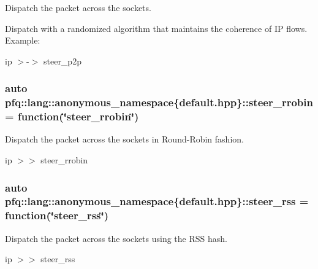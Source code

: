 Dispatch the packet across the sockets. 

Dispatch with a randomized algorithm that maintains the coherence of IP flows. Example\+:

ip $>$-\/$>$ steer\+\_\+p2p 
\subsubsection[{\texorpdfstring{steer\+\_\+rrobin}{steer_rrobin}}]{\setlength{\rightskip}{0pt plus 5cm}auto pfq\+::lang\+::anonymous\+\_\+namespace\{default.\+hpp\}\+::steer\+\_\+rrobin = {\bf function}(\char`\"{}steer\+\_\+rrobin\char`\"{})}\hypertarget{namespacepfq_1_1lang_1_1anonymous__namespace_02default_8hpp_03_a98f503710ebfe66f6866d642af30b1a8}{}\label{namespacepfq_1_1lang_1_1anonymous__namespace_02default_8hpp_03_a98f503710ebfe66f6866d642af30b1a8}


Dispatch the packet across the sockets in Round-\/\+Robin fashion. 

ip $>$$>$ steer\+\_\+rrobin 
\subsubsection[{\texorpdfstring{steer\+\_\+rss}{steer_rss}}]{\setlength{\rightskip}{0pt plus 5cm}auto pfq\+::lang\+::anonymous\+\_\+namespace\{default.\+hpp\}\+::steer\+\_\+rss = {\bf function}(\char`\"{}steer\+\_\+rss\char`\"{})}\hypertarget{namespacepfq_1_1lang_1_1anonymous__namespace_02default_8hpp_03_ae5f71a205afe1a8e3ed959d4c555fcb9}{}\label{namespacepfq_1_1lang_1_1anonymous__namespace_02default_8hpp_03_ae5f71a205afe1a8e3ed959d4c555fcb9}


Dispatch the packet across the sockets using the R\+SS hash. 

ip $>$$>$ steer\+\_\+rss 
